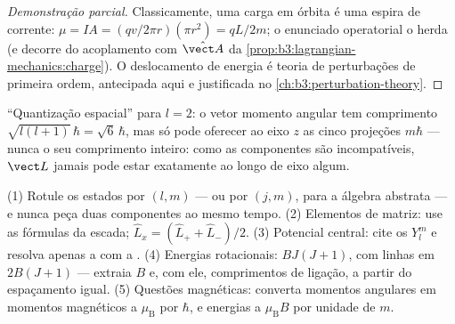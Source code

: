 \begin{proof}[Demonstração parcial]
Classicamente, uma carga em órbita é uma espira de corrente: $\mu = IA =
(qv/2\pi r)(\pi r^2) = qL/2m$; o enunciado operatorial o herda (e
decorre do acoplamento com $\hat{\vect A}$ da
\cref{prop:b3:lagrangian-mechanics:charge}). O deslocamento de energia
é teoria de perturbações de primeira ordem, antecipada aqui e
justificada no \cref{ch:b3:perturbation-theory}.
\end{proof}

\begin{omfigure}

{\small ``Quantização espacial'' para $l = 2$: o vetor momento angular
tem comprimento $\sqrt{l(l+1)}\,\hbar = \sqrt6\,\hbar$, mas só pode
oferecer ao eixo $z$ as cinco projeções $m\hbar$ --- nunca o seu
comprimento inteiro: como as componentes são incompatíveis, $\vect L$
jamais pode estar exatamente ao longo de eixo algum.}
\end{omfigure}

\begin{method}\label{met:b3:quantum-angular-momentum:method}
(1) Rotule os estados por $(l, m)$ --- ou por $(j, m)$, para a álgebra
abstrata --- e nunca peça duas componentes ao mesmo tempo. (2)
Elementos de matriz: use as fórmulas da escada; $\hat L_x = (\hat L_+ + \hat
L_-)/2$. (3) Potencial central: cite os $Y_l^m$ e resolva apenas a
 com a . (4) Energias rotacionais:
$BJ(J+1)$, com linhas em $2B(J+1)$ --- extraia $B$ e, com ele,
comprimentos de ligação, a partir do espaçamento igual. (5) Questões
magnéticas: converta momentos angulares em momentos magnéticos a
$\mu_{\text{B}}$ por $\hbar$, e energias a $\mu_{\text{B}}B$ por
unidade de $m$.
\end{method}

